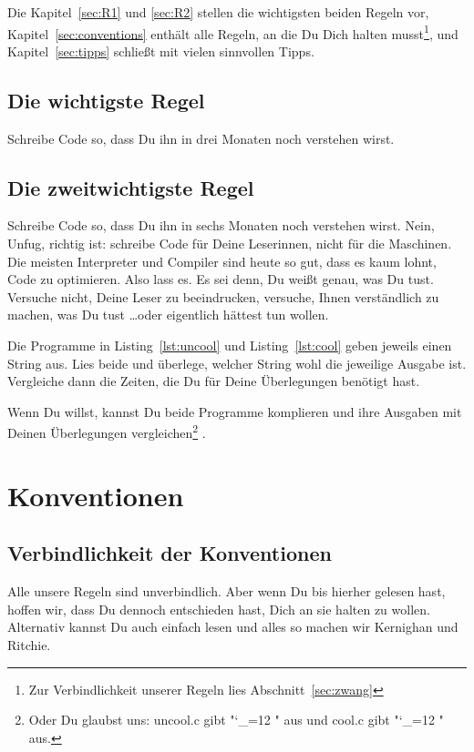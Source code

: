 \documentclass[twoside]{scrartcl}
\begin{document}
Die Kapitel~\ref{sec:R1} und \ref{sec:R2} stellen die wichtigsten beiden Regeln
vor, Kapitel~\ref{sec:conventions} enth\"a{}lt alle Regeln, an die Du Dich
halten musst\footnote{
  Zur Verbindlichkeit unserer Regeln lies Abschnitt~\ref{sec:zwang}
}, und Kapitel~\ref{sec:tipps} schlie\ss{}t mit vielen sinnvollen Tipps.

\subsection{Die wichtigste Regel\label{sec:R1}}
Schreibe Code so, dass Du ihn in drei Monaten noch verstehen wirst.

\subsection{Die zweitwichtigste Regel\label{sec:R2}}
Schreibe Code so, dass Du ihn in sechs Monaten noch verstehen wirst. Nein, 
Unfug, richtig ist: schreibe Code f\"u{}r Deine Leserinnen, nicht f\"u{}r die
Maschinen. Die meisten Interpreter und Compiler sind heute so gut, dass es
kaum lohnt, Code zu optimieren. Also lass es. Es sei denn, Du wei\ss{}t
genau, was Du tust. 
Versuche nicht, Deine Leser zu beeindrucken, versuche, Ihnen verst\"a{}ndlich zu
machen, was Du tust \ldots oder eigentlich h\"a{}ttest tun wollen.

Die Programme in  Listing~\ref{lst:uncool} und Listing~\ref{lst:cool} geben
jeweils einen String aus. Lies beide und
\"u{}berlege, welcher String wohl die jeweilige Ausgabe ist. Vergleiche dann die
Zeiten, die Du f\"u{}r Deine \"U{}berlegungen ben\"o{}tigt 
hast. 





Wenn Du willst, kannst Du  beide Programme komplieren und ihre Ausgaben mit
Deinen \"U{}berlegungen vergleichen\footnote{%
%
Oder Du glaubst uns: uncool.c gibt 
"\catcode`_=12 \ttfamily "
aus und cool.c gibt  
"\catcode`_=12 \ttfamily "
aus.
}%
. 

\section{Konventionen\label{sec:conventions}}
\subsection{Verbindlichkeit der Konventionen\label{sec:zwang}}
Alle unsere Regeln sind unverbindlich. Aber wenn Du bis hierher gelesen hast,
hoffen wir, dass Du dennoch entschieden hast, Dich an sie halten zu wollen.
Alternativ kannst Du auch einfach \cite{KR} lesen und alles so machen wir 
Kernighan und Ritchie.
\end{document}
